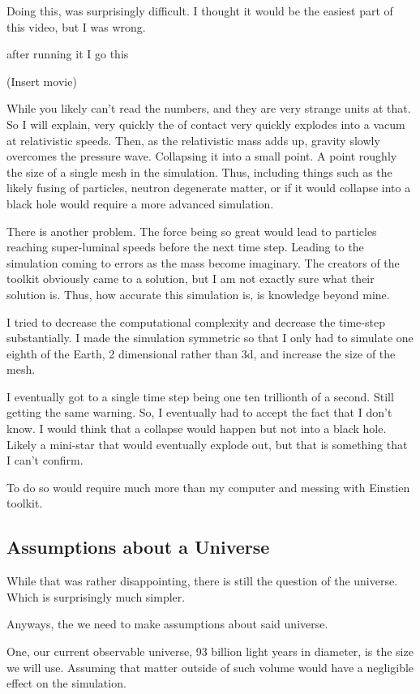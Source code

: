 Doing this, was surprisingly difficult. I thought it would be the easiest part of this video, but I was wrong.

after running it I go this

(Insert movie)

While you likely can't read the numbers, and they are very strange units at that. So I will explain, very quickly the of contact very quickly explodes into a vacum at relativistic speeds. Then, as the relativistic mass adds up, gravity slowly overcomes the pressure wave. Collapsing it into a small point. A point roughly the size of a single mesh in the simulation. Thus, including things such as the likely fusing of particles, neutron degenerate matter, or if it would collapse into a black hole would require a more advanced simulation.

There is another problem. The force being so great would lead to particles reaching super-luminal speeds before the next time step. Leading to the simulation coming to errors as the mass become imaginary. The creators of the toolkit obviously came to a solution, but I am not exactly sure what their solution is. Thus, how accurate this simulation is, is knowledge beyond mine.

I tried to decrease the computational complexity and decrease the time-step substantially. I made the simulation symmetric so that I only had to simulate one eighth of the Earth, 2 dimensional rather than 3d, and increase the size of the mesh.

I eventually got to a single time step being one ten trillionth of a second. Still getting the same warning. So, I eventually had to accept the fact that I don't know. I would think that a collapse would happen but not into a black hole. Likely a mini-star that would eventually explode out, but that is something that I can't confirm.

To do so would require much more than my computer and messing with Einstien toolkit.

\subsection{Assumptions about a Universe}

While that was rather disappointing, there is still the question of the universe. Which is surprisingly much simpler.

Anyways, the we need to make assumptions about said universe.

One, our current observable universe, 93 billion light years in diameter, is the size we will use. Assuming that matter outside of such volume would have a negligible effect on the simulation.

